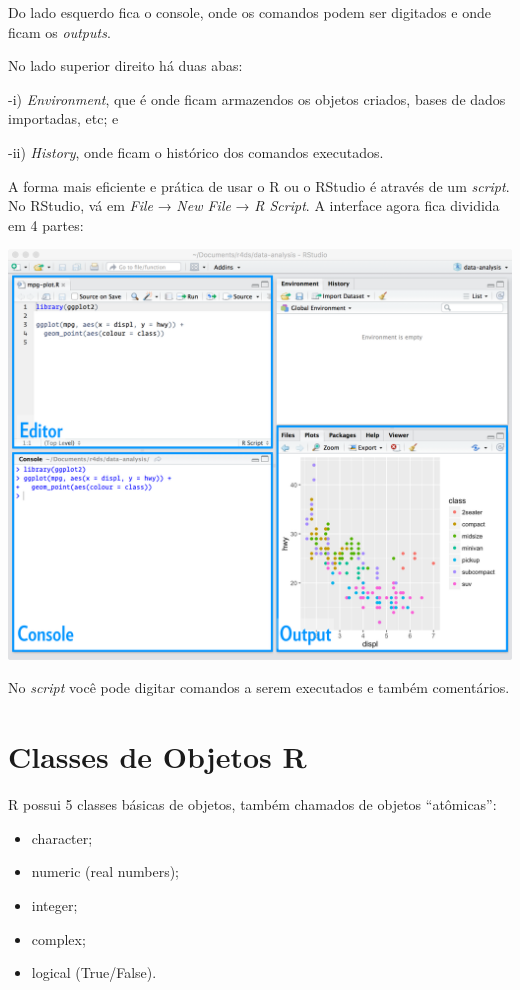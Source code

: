 \documentclass[]{book}
\begin{document}
Do lado esquerdo fica o console, onde os comandos podem ser digitados e onde ficam os \emph{outputs}.

No lado superior direito há duas abas:

-i) \emph{Environment}, que é onde ficam armazendos os objetos criados, bases de dados importadas, etc; e

-ii) \emph{History}, onde ficam o histórico dos comandos executados.

A forma mais eficiente e prática de usar o R ou o RStudio é através de um \emph{script}. No RStudio, vá em \emph{File} → \emph{New File} → \emph{R Script}. A interface agora fica dividida em 4 partes:

\begin{center}\includegraphics[width=0.9\linewidth]{imagens/rstudio-editor} \end{center}

No \emph{script} você pode digitar comandos a serem executados e também comentários.

\hypertarget{classes-de-objetos-r}{%
\section{Classes de Objetos R}\label{classes-de-objetos-r}}

R possui 5 classes básicas de objetos, também chamados de objetos ``atômicas'':

\begin{itemize}
\item
  character;
\item
  numeric (real numbers);
\item
  integer;
\item
  complex;
\item
  logical (True/False).
\end{itemize}
\end{document}
